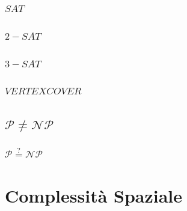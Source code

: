 \documentclass{article}  %
\theoremstyle{definition}
\begin{document}
\subsubsection{$SAT$}
\subsubsection{$2-SAT$}
\subsubsection{$3-SAT$}
\subsubsection{$VERTEX COVER$}

\subsection{$\mathcal{P} \neq \mathcal{NP}$}
\subsubsection{$\mathcal{P} \overset{?}{=} \mathcal{NP}$}
\break
\section{Complessità Spaziale}
\end{document}
